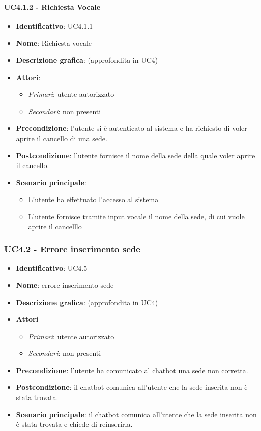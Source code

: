 \paragraph{UC4.1.2 - Richiesta Vocale}
\begin{itemize}
   \item \textbf{Identificativo}: UC4.1.1
   \item \textbf{Nome}: Richiesta vocale
   \item \textbf{Descrizione grafica}: (approfondita in UC4)
   \item \textbf{Attori}:
   \begin{itemize} 
       \item \textit{Primari}: utente autorizzato
       \item \textit{Secondari}: non presenti
   \end{itemize}
       \item \textbf{Precondizione}: l'utente si è autenticato al sistema e ha richiesto di voler aprire il cancello di una sede. 
       \item \textbf{Postcondizione}: l'utente fornisce il nome della sede della quale voler aprire il cancello.
    \item \textbf{Scenario principale}: 
       \begin{itemize}
           \item L'utente ha effettuato l'accesso al sistema 
           \item L'utente fornisce tramite input vocale il nome della sede, di cui vuole aprire il cancelllo
       \end{itemize}
\end{itemize}

\subsubsection{UC4.2 - Errore inserimento sede}
\begin{itemize}
    \item \textbf{Identificativo}: UC4.5
    \item \textbf{Nome}: errore inserimento sede
    \item \textbf{Descrizione grafica}: (approfondita in UC4)
    \item \textbf{Attori}
 \begin{itemize} 
    \item \textit{Primari}: utente autorizzato 
    \item \textit{Secondari}: non presenti
 \end{itemize}
 \item \textbf{Precondizione}: l'utente ha comunicato al chatbot una sede non corretta.
 \item \textbf{Postcondizione}: il chatbot comunica all'utente che la sede inserita non è stata trovata.
 \item \textbf{Scenario principale}: il chatbot comunica all'utente che la sede inserita non è stata trovata e chiede di reinserirla.
\end{itemize}
\newpage
